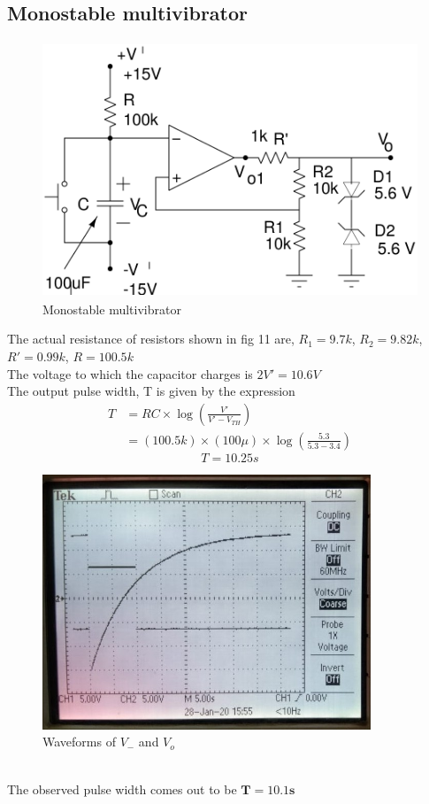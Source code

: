 \documentclass[12pt]{article}
\begin{document}
      \subsection{Monostable multivibrator}
      \begin{figure}[H]
            \centering
            \includegraphics[width = 0.6\linewidth, height = 3in]{reports/lab2/mono.png}
            \caption{Monostable multivibrator}
        \end{figure}
       The actual resistance of resistors shown in fig 11 are,
        $R_1 = 9.7k$, $R_2 = 9.82k$, $R' = 0.99k$, $R = 100.5k$\\
        The voltage to which the capacitor charges is $2V' = 10.6V$\\
        \newpage
    The output pulse width, T is given by the expression
      \begin{align*} 
            T & = RC \times \log(\frac{V'}{V'-V_{TH}})\\
              & = (100.5k)\times(100\mu)\times\log(\frac{5.3}{5.3-3.4})
      \end{align*}
      \begin{equation}
            \boxed{T = 10.25s}
      \end{equation}
      
      \begin{figure}[H]
            \centering
            \includegraphics[width = 0.6\linewidth, height = 3in]{reports/lab2/monostable.jpeg}  
            \caption{Waveforms of $V_{-}$ and $V_{o}$}
        \end{figure}
      \\
    The observed pulse width comes out to be $\mathbf{T = 10.1s}$ 
\end{document}
